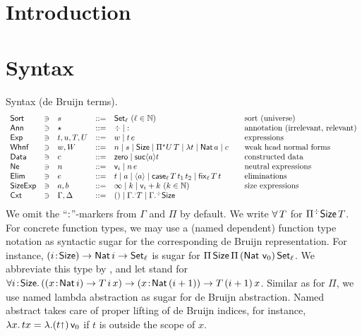 \documentclass[acmlarge,review,anonymous]{acmart}\settopmatter{printfolios=true}
\begin{document}
\section{Introduction}
\label{sec:intro}

\newpage

\section{Syntax}

Syntax (de Bruijn terms).
\[
\begin{array}{lllrl@{\qquad}l}
\Sort & \ni & s
    & ::= & \Set[\ell] ~(\ell \in \NN)& \mbox{sort (universe)} \\
\Ann & \ni & \star & ::= & \erased \mid \noterased & \mbox{annotation (irrelevant, relevant)}\\
\Exp & \ni & t,u,T,U
    & ::= & w \mid t\,e & \mbox{expressions} \\
\Whnf & \ni & w, W
    & ::= & n \mid s \mid \Size \mid \epiT U T %
    \mid \lambda t%
    \mid \Nat a \mid c & \mbox{weak head normal forms} \\ %
\Data & \ni & c
   & ::= & \tzero \mid \suc a t & \mbox{constructed data} \\
\Ne & \ni & n
    & ::= & \ind i \mid n \, e & \mbox{neutral expressions} \\
\Elim & \ni & e
    & ::= & t \mid a \mid \ann a \mid \case[\ell] T {t_1} t_2 \mid \fix[\ell] T t & \mbox{eliminations} \\
\SizeExp & \ni & a,b & ::= & \infty \mid k \mid \ind i + k ~(k \in \NN) & \mbox{size expressions} \\
\Cxt & \ni & \Gamma, \Delta & ::= & \cempty \mid \erext[\noterased] \Gamma T \mid \erext \Gamma \Size \\
\end{array}
\]
We omit the ``$\noterased$''-markers from $\Gamma$ and $\Pi$ by default.  We write $\forallT T$ for $\erpiT \Size T$.
For concrete function types, we may use a (named dependent) function type notation as syntactic sugar for the corresponding de Bruijn representation.  For instance, $\funT i \Size \Nat i \to \Set[\ell]$ is sugar for $\piT \Size \piT {(\Nat\,\ind 0)} \Set[\ell]$.  We abbreviate this type by \fbox{$\FixK\,\ell$}, and let  stand for $\allT i \Size (\funT x {\Nat i} T\, i\, x) \to \funT x {\Nat (i + 1)} T \,(i+1)\, x$. Similar as for $\Pi$, we use named lambda abstraction as sugar for de Bruijn abstraction.  Named abstract takes care of proper lifting of de Bruijn indices, for instance, $\lambda x.\, t x = \lambda. (t \slift)\,\ind 0$ if $t$ is outside the scope of $x$.
\end{document}
